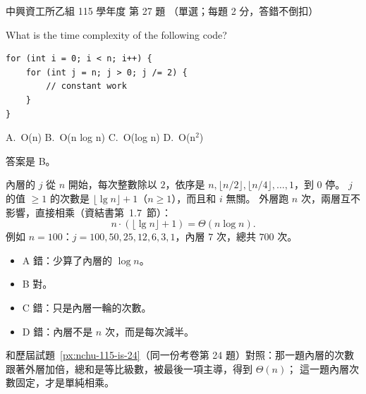 \begin{pastexam}[label={px:nchu-115-is-27}]{中興資工所乙組 115 學年度 第 27 題}
（單選；每題 2 分，答錯不倒扣）

What is the time complexity of the following code?
\begin{verbatim}
for (int i = 0; i < n; i++) {
    for (int j = n; j > 0; j /= 2) {
        // constant work
    }
}
\end{verbatim}
A.~O(n) \qquad B.~O(n log n) \qquad C.~O(log n) \qquad D.~O(n$^2$)
\end{pastexam}

\begin{pastsoln}
答案是 B。

內層的 $j$ 從 $n$ 開始，每次整數除以 $2$，依序是 $n, \lfloor n/2 \rfloor, \lfloor n/4 \rfloor,
\ldots, 1$，到 $0$ 停。 $j$ 的值 $\ge 1$ 的次數是 $\lfloor \lg n \rfloor + 1$（$n \ge 1$），而且和
$i$ 無關。 外層跑 $n$ 次，兩層互不影響，直接相乘（資結書第~1.7~節）：
\[
n \cdot (\lfloor \lg n \rfloor + 1) = \Theta(n \log n).
\]
例如 $n = 100$：$j = 100, 50, 25, 12, 6, 3, 1$，內層 $7$ 次，總共 $700$ 次。
\begin{itemize}
\item A 錯：少算了內層的 $\log n$。
\item B 對。
\item C 錯：只是內層一輪的次數。
\item D 錯：內層不是 $n$ 次，而是每次減半。
\end{itemize}
和歷屆試題~\ref{px:nchu-115-is-24}（同一份考卷第 24 題）對照：那一題內層的次數跟著外層加倍，總和是等比級數，被最後一項主導，得到 $\Theta(n)$；
這一題內層次數固定，才是單純相乘。
\end{pastsoln}
